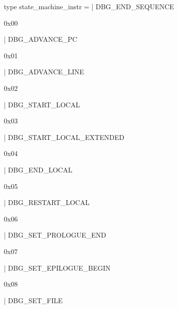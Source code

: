 \documentclass[11pt]{article}
\begin{document}
\label{type:Dex.state-underscoremachine-underscoreinstr}\begin{ocamldoccode}
type state_machine_instr =
  | DBG_END_SEQUENCE
\end{ocamldoccode}
\begin{ocamldoccomment}
0x00
\end{ocamldoccomment}
\begin{ocamldoccode}
  | DBG_ADVANCE_PC
\end{ocamldoccode}
\begin{ocamldoccomment}
0x01
\end{ocamldoccomment}
\begin{ocamldoccode}
  | DBG_ADVANCE_LINE
\end{ocamldoccode}
\begin{ocamldoccomment}
0x02
\end{ocamldoccomment}
\begin{ocamldoccode}
  | DBG_START_LOCAL
\end{ocamldoccode}
\begin{ocamldoccomment}
0x03
\end{ocamldoccomment}
\begin{ocamldoccode}
  | DBG_START_LOCAL_EXTENDED
\end{ocamldoccode}
\begin{ocamldoccomment}
0x04
\end{ocamldoccomment}
\begin{ocamldoccode}
  | DBG_END_LOCAL
\end{ocamldoccode}
\begin{ocamldoccomment}
0x05
\end{ocamldoccomment}
\begin{ocamldoccode}
  | DBG_RESTART_LOCAL
\end{ocamldoccode}
\begin{ocamldoccomment}
0x06
\end{ocamldoccomment}
\begin{ocamldoccode}
  | DBG_SET_PROLOGUE_END
\end{ocamldoccode}
\begin{ocamldoccomment}
0x07
\end{ocamldoccomment}
\begin{ocamldoccode}
  | DBG_SET_EPILOGUE_BEGIN
\end{ocamldoccode}
\begin{ocamldoccomment}
0x08
\end{ocamldoccomment}
\begin{ocamldoccode}
  | DBG_SET_FILE
\end{ocamldoccode}
\end{document}

